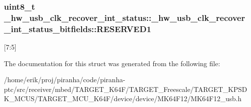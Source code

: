 \subsubsection[{\texorpdfstring{R\+E\+S\+E\+R\+V\+E\+D1}{RESERVED1}}]{\setlength{\rightskip}{0pt plus 5cm}uint8\+\_\+t \+\_\+hw\+\_\+usb\+\_\+clk\+\_\+recover\+\_\+int\+\_\+status\+::\+\_\+hw\+\_\+usb\+\_\+clk\+\_\+recover\+\_\+int\+\_\+status\+\_\+bitfields\+::\+R\+E\+S\+E\+R\+V\+E\+D1}\hypertarget{struct__hw__usb__clk__recover__int__status_1_1__hw__usb__clk__recover__int__status__bitfields_adfb8357ac7bca278d5626b2ad408fd18}{}\label{struct__hw__usb__clk__recover__int__status_1_1__hw__usb__clk__recover__int__status__bitfields_adfb8357ac7bca278d5626b2ad408fd18}
\mbox{[}7\+:5\mbox{]} 

The documentation for this struct was generated from the following file\+:\begin{DoxyCompactItemize}
\item 
/home/erik/proj/piranha/code/piranha-\/ptc/src/receiver/mbed/\+T\+A\+R\+G\+E\+T\+\_\+\+K64\+F/\+T\+A\+R\+G\+E\+T\+\_\+\+Freescale/\+T\+A\+R\+G\+E\+T\+\_\+\+K\+P\+S\+D\+K\+\_\+\+M\+C\+U\+S/\+T\+A\+R\+G\+E\+T\+\_\+\+M\+C\+U\+\_\+\+K64\+F/device/device/\+M\+K64\+F12/M\+K64\+F12\+\_\+usb.\+h\end{DoxyCompactItemize}
